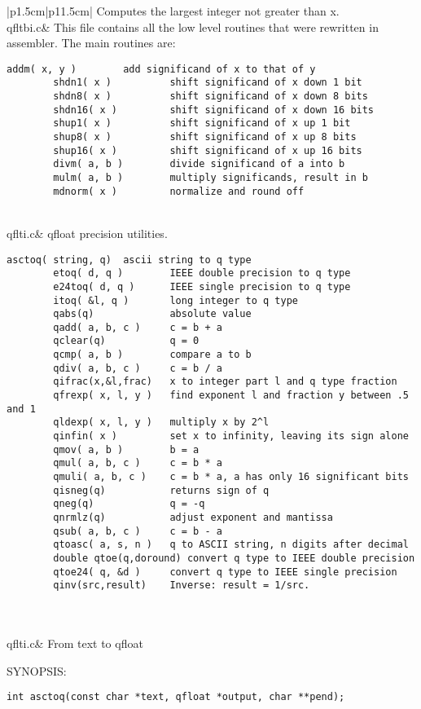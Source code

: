 \documentclass[10pt,a4paper,x11names]{memoir} %
\begin{document}
\begin{longtable}{|p{1.5cm}|p{11.5cm}|}
	Computes the largest integer not greater than x.
	\\\hline 
	qfltbi.c&\index{qfltbi.c}
	This file contains all the low level routines that were rewritten in assembler. The main routines are:
	\begin{lstlisting}[numbers=none]
		addm( x, y )        add significand of x to that of y
		shdn1( x )          shift significand of x down 1 bit
		shdn8( x )          shift significand of x down 8 bits
		shdn16( x )         shift significand of x down 16 bits
		shup1( x )          shift significand of x up 1 bit
		shup8( x )          shift significand of x up 8 bits
		shup16( x )         shift significand of x up 16 bits
		divm( a, b )        divide significand of a into b
		mulm( a, b )        multiply significands, result in b
		mdnorm( x )         normalize and round off
	\end{lstlisting}
	\\\hline
	qflti.c&\index{qflti.c}
	qfloat precision utilities.
	\begin{lstlisting}[numbers=none]
		asctoq( string, q)  ascii string to q type
		etoq( d, q )        IEEE double precision to q type
		e24toq( d, q )      IEEE single precision to q type
		itoq( &l, q )       long integer to q type
		qabs(q)             absolute value
		qadd( a, b, c )     c = b + a
		qclear(q)           q = 0
		qcmp( a, b )        compare a to b
		qdiv( a, b, c )     c = b / a
		qifrac(x,&l,frac)   x to integer part l and q type fraction
		qfrexp( x, l, y )   find exponent l and fraction y between .5 and 1
		qldexp( x, l, y )   multiply x by 2^l
		qinfin( x )         set x to infinity, leaving its sign alone
		qmov( a, b )        b = a
		qmul( a, b, c )     c = b * a
		qmuli( a, b, c )    c = b * a, a has only 16 significant bits
		qisneg(q)           returns sign of q
		qneg(q)             q = -q
		qnrmlz(q)           adjust exponent and mantissa
		qsub( a, b, c )     c = b - a
		qtoasc( a, s, n )   q to ASCII string, n digits after decimal
		double qtoe(q,doround) convert q type to IEEE double precision
		qtoe24( q, &d )     convert q type to IEEE single precision
		qinv(src,result)    Inverse: result = 1/src. 
	\end{lstlisting}
	\\\hline
	\\\hline
	qflti.c& From text to qfloat
	
	{\footnotesize SYNOPSIS:}\vspace{-0.2cm}
	\begin{lstlisting}[numbers=none]
		int asctoq(const char *text, qfloat *output, char **pend);
	\end{lstlisting}
	

\end{longtable}
\end{document}
